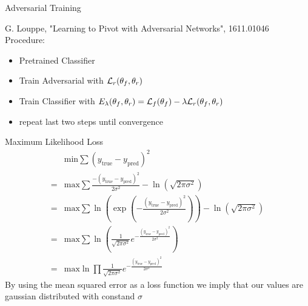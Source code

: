 \documentclass[10pt]{beamer}
\begin{document}
\begin{frame}{Adversarial Training}

    \footnotesize{\color{gray} G. Louppe, "Learning to Pivot with Adversarial Networks", 1611.01046} \\
  Procedure:
  \begin{itemize}
  \item Pretrained Classifier
  \item Train Adversarial with  $ {\cal L}_r(\theta_f, \theta_r)$
  \item Train Classifier with $ E_\lambda(\theta_f, \theta_r) = {\cal L}_f(\theta_f) - \lambda {\cal L}_r(\theta_f, \theta_r)$ 
  \item repeat last two steps until convergence
  \end{itemize}

  \color{red}{$\Rightarrow$ no stable results}
\end{frame}

\begin{frame}{Maximum Likelihood Loss}
  \begin{align*}
    &\text{min} \sum (y_{\text{true}}-y_{\text{pred}})^2 \\
    =&\text{max} \sum\frac{-(y_{\text{true}}-y_{\text{pred}})^2}{2 \sigma^2} - \ln(\sqrt{2\pi \sigma^2}) \\
    = &\text{max} \sum \ln(\exp(-\frac{(y_{\text{true}}-y_{\text{pred}})^2}{2 \sigma^2})) - \ln(\sqrt{2\pi \sigma^2}) \\
    = &\text{max} \sum \ln( \frac{1}{\sqrt{2\pi \sigma^2}} e^{-\frac{(y_{\text{true}}-y_{\text{pred}})^2}{2 \sigma^2}}) \\
    = &\text{max} \ln \prod \frac{1}{\sqrt{2\pi \sigma^2}} e^{-\frac{(y_{\text{true}}-y_{\text{pred}})^2}{2 \sigma^2}}
  \end{align*}
    By using the mean squared error as a loss function we imply that our values are gaussian distributed with constand $\sigma$
\end{frame}
\end{document}
